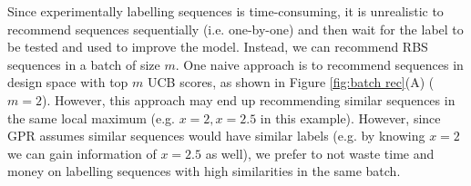 Since experimentally labelling sequences is time-consuming, it is unrealistic to recommend sequences sequentially (i.e. one-by-one) and then wait for the label to be tested and used to improve the model.
Instead, we can recommend RBS sequences in a batch of size $m$. 
One naive approach is to 
recommend sequences in design space with top $m$ UCB scores, as shown in Figure \ref{fig:batch rec}(A) ($m = 2$).
However, this approach may end up recommending similar sequences in the same local maximum (e.g. $x = 2, x =2.5$ in this example). 
However, since GPR assumes similar sequences would have similar labels (e.g. by knowing $x=2$ we can gain information of $x=2.5$ as well), we prefer to not waste time and money on labelling sequences with high similarities in the same batch.


